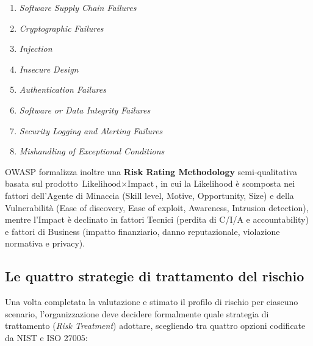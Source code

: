 \documentclass[../../main.tex]{subfiles}
\begin{document}
\begin{itemize}
\begin{enumerate}[label={A\arabic*:{2025} --}]
        \item \textit{Software Supply Chain Failures}
        \item \textit{Cryptographic Failures}
        \item \textit{Injection}
        \item \textit{Insecure Design}
        \item \textit{Authentication Failures}
        \item \textit{Software or Data Integrity Failures}
        \item \textit{Security Logging and Alerting Failures}
        \item \textit{Mishandling of Exceptional Conditions}
    \end{enumerate}
    OWASP formalizza inoltre una \textbf{Risk Rating Methodology} semi-qualitativa basata sul prodotto $\text{Likelihood} \times \text{Impact}$, in cui la Likelihood è scomposta nei fattori dell'Agente di Minaccia (Skill level, Motive, Opportunity, Size) e della Vulnerabilità (Ease of discovery, Ease of exploit, Awareness, Intrusion detection), mentre l'Impact è declinato in fattori Tecnici (perdita di C/I/A e accountability) e fattori di Business (impatto finanziario, danno reputazionale, violazione normativa e privacy).
\end{itemize}

\subsection{Le quattro strategie di trattamento del rischio}
Una volta completata la valutazione e stimato il profilo di rischio per ciascuno scenario, l'organizzazione deve decidere formalmente quale strategia di trattamento (\textit{Risk Treatment}) adottare, scegliendo tra quattro opzioni codificate da NIST e ISO 27005:
\end{document}
